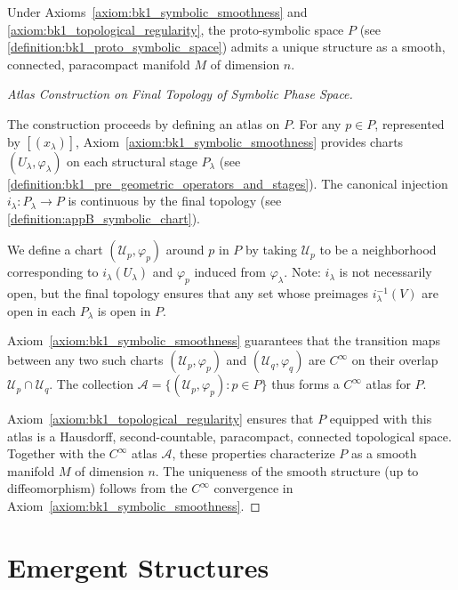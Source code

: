 \begin{theorem}
\label{theorem:bk1_manifold_emergence}
Under Axioms~\ref{axiom:bk1_symbolic_smoothness} and \ref{axiom:bk1_topological_regularity}, the proto-symbolic space $P$ (see \ref{definition:bk1_proto_symbolic_space}) admits a unique structure as a smooth, connected, paracompact manifold $M$ of dimension $n$.

\begin{proof}[Atlas Construction on Final Topology of Symbolic Phase Space]
\label{proof:bk1_atlas_final_topology_phase_space}
\leavevmode

The construction proceeds by defining an atlas on $P$. For any $p \in P$, represented by $[(x_\lambda)]$, Axiom~\ref{axiom:bk1_symbolic_smoothness} provides charts $(U_\lambda, \varphi_\lambda)$ on each structural stage $P_\lambda$ (see \ref{definition:bk1_pre_geometric_operators_and_stages}). The canonical injection $i_\lambda: P_\lambda \to P$ is continuous by the final topology (see \ref{definition:appB_symbolic_chart}).

We define a chart $(\mathcal{U}_p, \varphi_p)$ around $p$ in $P$ by taking $\mathcal{U}_p$ to be a neighborhood corresponding to $i_\lambda(U_\lambda)$ and $\varphi_p$ induced from $\varphi_\lambda$. Note: $i_\lambda$ is not necessarily open, but the final topology ensures that any set whose preimages $i_\lambda^{-1}(V)$ are open in each $P_\lambda$ is open in $P$.

Axiom~\ref{axiom:bk1_symbolic_smoothness} guarantees that the transition maps between any two such charts $(\mathcal{U}_p, \varphi_p)$ and $(\mathcal{U}_q, \varphi_q)$ are $C^\infty$ on their overlap $\mathcal{U}_p \cap \mathcal{U}_q$. The collection $\mathcal{A} = \{(\mathcal{U}_p, \varphi_p) : p \in P\}$ thus forms a $C^\infty$ atlas for $P$.

Axiom~\ref{axiom:bk1_topological_regularity} ensures that $P$ equipped with this atlas is a Hausdorff, second-countable, paracompact, connected topological space. Together with the $C^\infty$ atlas $\mathcal{A}$, these properties characterize $P$ as a smooth manifold $M$ of dimension $n$. The uniqueness of the smooth structure (up to diffeomorphism) follows from the $C^\infty$ convergence in Axiom~\ref{axiom:bk1_symbolic_smoothness}.
\end{proof}
\end{theorem}

\section{Emergent Structures}
\label{subsec:bk1_emergent_structures}

